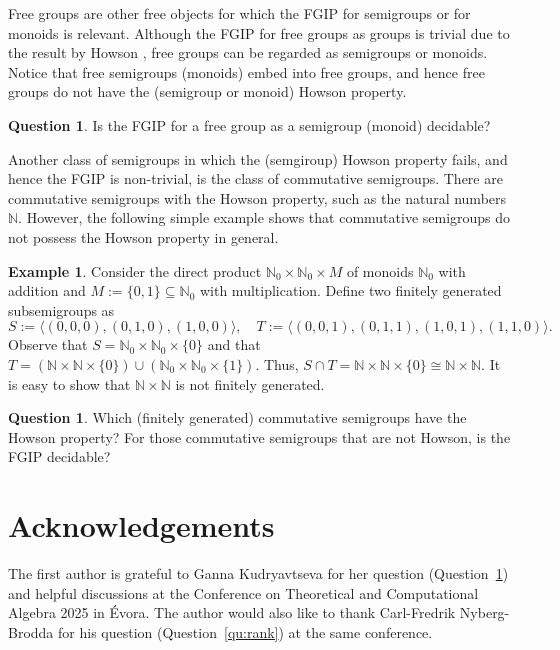 \documentclass[reqno]{amsart}
\theoremstyle{plain}
\theoremstyle{definition}
\newtheorem{ex}[lem]{Example}
\newtheorem{question}[lem]{Question}
\numberwithin{equation}{section}
\begin{document}
Free groups are other free objects for which the FGIP for semigroups or for monoids is relevant. Although the FGIP for free groups as groups is trivial due to the result by Howson \cite{Howson}, free groups can be regarded as semigroups or monoids. Notice that free semigroups (monoids) embed into free groups, and hence free groups do not have the (semigroup or monoid) Howson property.

\begin{question}\label{qu:FGIPFG}
Is the FGIP for a free group as a semigroup (monoid) decidable?
\end{question}


Another class of semigroups in which the (semgiroup) Howson property fails, and hence the FGIP is non-trivial, is the class of commutative semigroups. There are commutative semigroups with the Howson property, such as the natural numbers $\mathbb{N}$. However, the following simple example shows that commutative semigroups do not possess the Howson property in general. 

\begin{ex}
\label{ex:commnonHowson}
Consider the direct product $\mathbb{N}_0 \times \mathbb{N}_0\times M$ of monoids $\mathbb{N}_0$ with addition and $M := \{0, 1\} \subseteq \mathbb{N}_0$ with multiplication. Define two finitely generated subsemigroups as 
\[
S := \langle (0, 0, 0), (0, 1, 0), (1, 0, 0)\rangle, \quad T := \langle (0, 0, 1), (0, 1, 1), (1, 0, 1), (1, 1, 0)\rangle.
\]
Observe that $S = \mathbb{N}_0\times\mathbb{N}_0\times\{0\}$ and that $T = (\mathbb{N}\times\mathbb{N}\times\{0\})\cup(\mathbb{N}_0\times\mathbb{N}_0\times \{1\})$. Thus, $S\cap T = \mathbb{N}\times\mathbb{N}\times\{0\} \cong \mathbb{N}\times\mathbb{N}$. It is easy to show that $\mathbb{N}\times\mathbb{N}$ is not finitely generated.
\end{ex}

\begin{question}
\label{open:commHowson}
Which (finitely generated) commutative semigroups have the Howson property? For those commutative semigroups that are not Howson, is the FGIP decidable?
\end{question}

\section*{Acknowledgements} 
The first author is grateful to Ganna Kudryavtseva for her question (Question~\ref{qu:FGIPFG}) and helpful discussions at the Conference on Theoretical and Computational Algebra 2025 in \'{E}vora. The author would also like to thank Carl-Fredrik Nyberg-Brodda for his question (Question~\ref{qu:rank}) at the same conference.





	
\end{document}
